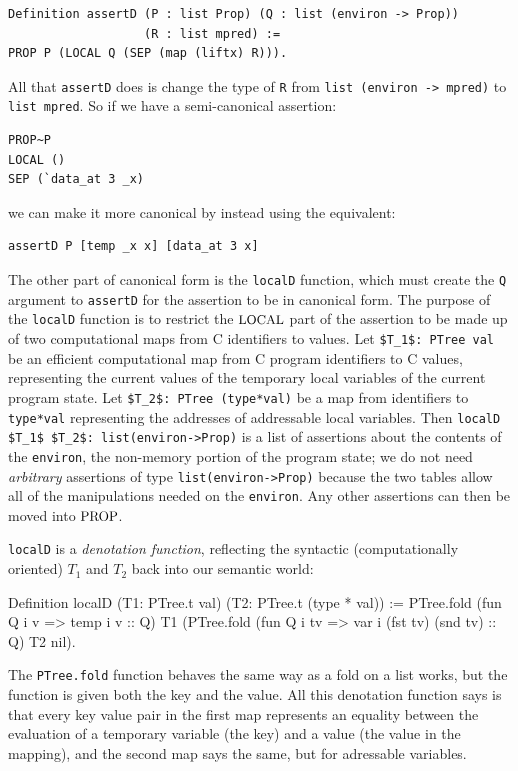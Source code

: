 \documentclass{puthesis}
\begin{document}
\begin{lstlisting}
Definition assertD (P : list Prop) (Q : list (environ -> Prop)) 
                   (R : list mpred) := 
PROP P (LOCAL Q (SEP (map (liftx) R))).
\end{lstlisting}

All that \lstinline|assertD| does is change the type of \lstinline|R| from 
\lstinline|list (environ -> mpred)| to \lstinline|list mpred|.
So if we have a semi-canonical assertion:

\begin{lstlisting}
PROP~P
LOCAL ()
SEP (`data_at 3 _x)
\end{lstlisting}

we can make it more canonical by instead using the equivalent:

\begin{lstlisting}
assertD P [temp _x x] [data_at 3 x]
\end{lstlisting}

The other part of canonical form is the \lstinline|localD| function,
which must create the \lstinline|Q| argument to \lstinline|assertD|
for the assertion to be in canonical form. The purpose of the
\lstinline|localD| function is to restrict the $\mbox{\small LOCAL}$ part of the
assertion to be made up of two computational maps from C identifiers
to values. Let \lstinline{$T_1$: PTree val} be an efficient
computational map from C program identifiers to C values, representing
the current values of the temporary local variables of the current
program state. Let \lstinline{$T_2$: PTree (type*val)} be a map from
identifiers to \lstinline{type*val} representing the addresses of
addressable local variables.  
Then \lstinline{localD $T_1$ $T_2$: list(environ->Prop)} is a list of
assertions about the contents of the \lstinline{environ}, the
non-memory portion of the program state;
we do not need \emph{arbitrary} assertions of type
\lstinline{list(environ->Prop)} because the two tables allow all of
the manipulations needed on the \lstinline|environ|. Any other
assertions can then be moved into $\mbox{\small PROP}$.

\lstinline{localD} is a \emph{denotation function}, reflecting the
syntactic (computationally oriented) $T_1$ and $T_2$ back into our
semantic world:

Definition localD (T1: PTree.t val) (T2: PTree.t (type * val)) :=
  PTree.fold (fun Q i v => temp i v :: Q) T1
    (PTree.fold (fun Q i tv => var i (fst tv) (snd tv) :: Q) T2 nil).


The \lstinline|PTree.fold| function behaves the same way as a fold on
a list works, but the function is given both the key and the
value. All this denotation function says is that every key value pair
in the first map represents an equality between the evaluation of a
temporary variable (the key) and a value (the value in the mapping),
and the second map says the same, but for adressable variables.
\end{document}
